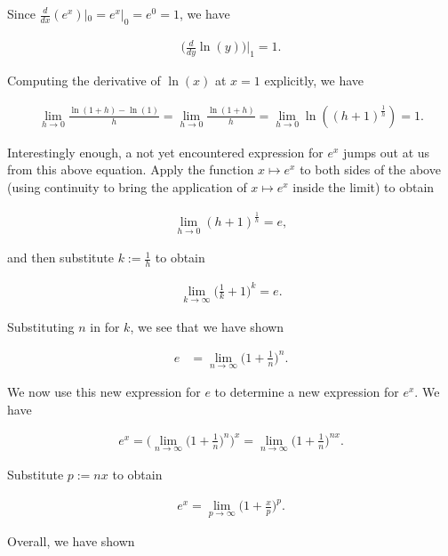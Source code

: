 Since $\frac{d}{dx}(e^x)|_0 = e^x|_0 = e^0 = 1$, we have

\begin{align*}
    \Big(\frac{d}{dy} \ln(y)\Big)\Big|_1 = 1.
\end{align*}

Computing the derivative of $\ln(x)$ at $x = 1$ explicitly, we have

\begin{align*}
    \lim_{h \rightarrow 0} \frac{\ln(1 + h) - \ln(1)}{h} = \lim_{h \rightarrow 0} \frac{\ln(1 + h)}{h} = \lim_{h \rightarrow 0} \ln((h + 1)^\frac{1}{h}) = 1.
\end{align*}

Interestingly enough, a not yet encountered expression for $e^x$ jumps out at us from this above equation. Apply the function $x \mapsto e^x$ to both sides of the above (using continuity to bring the application of $x \mapsto e^x$ inside the limit) to obtain

\begin{align*}
    \lim_{h \rightarrow 0} (h + 1)^{\frac{1}{h}} = e,
\end{align*}

and then substitute $k := \frac{1}{h}$ to obtain

\begin{align*}
   \lim_{k \rightarrow \infty} \Big( \frac{1}{k} + 1 \Big)^k = e.
\end{align*}

Substituting $n$ in for $k$, we see that we have shown

\begin{align*}
    e &= \lim_{n \rightarrow \infty} \Big(1 + \frac{1}{n} \Big)^n.
\end{align*}

We now use this new expression for $e$ to determine a new expression for $e^x$. We have

\begin{align*}
    e^x = \Big( \lim_{n \rightarrow \infty} \Big(1 + \frac{1}{n} \Big)^n \Big)^x = \lim_{n \rightarrow \infty} \Big(1 + \frac{1}{n}\Big)^{nx}.
\end{align*}

Substitute $p := nx$ to obtain

\begin{align*}
    e^x = \lim_{p \rightarrow \infty} \Big( 1 + \frac{x}{p} \Big)^p.
\end{align*}

Overall, we have shown

